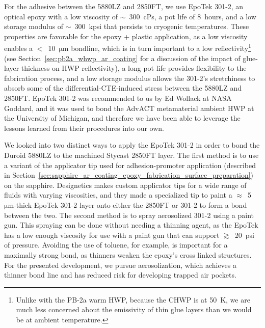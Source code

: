 For the adhesive between the 5880LZ and 2850FT, we use EpoTek 301-2, an optical epoxy with a low viscosity of $\sim$~300~cPs, a pot life of 8~hours, and a low storage modulus of $\sim$~300~kpsi that persists to cryogenic temperatures. These properties are favorable for the epoxy + plastic application, as a low viscosity enables a $<$~10~$\mathrm{\mu m}$ bondline, which is in turn important to a low reflectivity\footnote{Unlike with the PB-2a warm HWP, because the CHWP is at 50~K, we are much less concerned about the emissivity of thin glue layers than we would be at ambient temperature.} (see Section~\ref{sec:pb2a_whwp_ar_coating} for a discussion of the impact of glue-layer thickness on HWP reflectivity), a long pot life provides flexibility to the fabrication process, and a low storage modulus allows the 301-2's stretchiness to absorb some of the differential-CTE-induced stress between the 5880LZ and 2850FT. EpoTek 301-2 was recommended to us by Ed Wollack at NASA Goddard, and it was used to bond the AdvACT metamaterial ambient HWP at the University of Michigan, and therefore we have been able to leverage the lessons learned from their procedures into our own.

We looked into two distinct ways to apply the EpoTek 301-2 in order to bond the Duroid 5880LZ to the machined Stycast 2850FT layer. The first method is to use a variant of the applicator tip used for adhesion-promoter application (described in Section~\ref{sec:sapphire_ar_coating_epoxy_fabrication_surface_preparation}) on the sapphire. Designetics makes custom applicator tips for a wide range of fluids with varying viscosities, and they made a specialized tip to paint a $\approx$~5~$\mathrm{\mu m}$-thick EpoTek 301-2 layer onto either the 2850FT or 301-2 to form a bond between the two. The second method is to spray aerosolized 301-2 using a paint gun. This spraying can be done without needing a thinning agent, as the EpoTek has a low enough viscosity for use with a paint gun that can support $\gtrsim$~20~psi of pressure. Avoiding the use of toluene, for example, is important for a maximally strong bond, as thinners weaken the epoxy's cross linked structures. For the presented development, we pursue aerosolization, which achieves a thinner bond line and has reduced risk for developing trapped air pockets.

